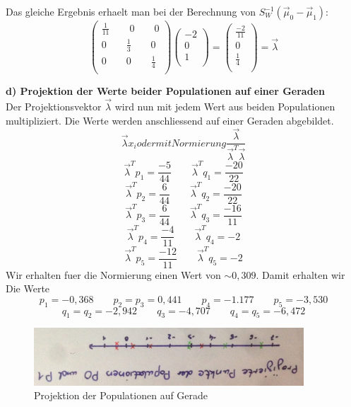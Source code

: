 \documentclass{article}
\begin{document}
Das gleiche Ergebnis erhaelt man bei der Berechnung von $S_W^{-1}(\vec{\mu}_0 - \vec{\mu}_1)$:
\[
\left(
\begin {array} {c}
\frac{1}{11} \qquad 0 \qquad 0  \\
0 \qquad \frac{1}{3} \qquad 0  \\
0 \qquad 0 \qquad \frac{1}{4}  \\
\end {array}
\right)
\left(
\begin {array} {c}
-2  \\
0  \\
1  \\
\end {array}
\right)
=
\left(
\begin {array} {c}
\frac{-2}{11}  \\
0  \\
\frac{1}{4}  \\
\end {array}
\right)
= \vec{\lambda}
\]

\textbf{d) Projektion der Werte beider Populationen auf einer Geraden} \\
Der Projektionsvektor $\vec{\lambda}$ wird nun mit jedem Wert aus beiden Populationen multipliziert.
Die Werte werden anschliessend auf einer Geraden abgebildet.
\[
\vec{\lambda} x_i oder mit Normierung \frac{\vec{\lambda}}{\vec{\lambda}^T\vec{\lambda}}
\]
\[
\vec{\lambda}^Tp_1 = \frac{-5}{44} \qquad \vec{\lambda}^Tq_1 = \frac{-20}{22}
\]
\[
\vec{\lambda}^Tp_2 = \frac{6}{44} \qquad \vec{\lambda}^Tq_2 = \frac{-20}{22}
\]
\[
\vec{\lambda}^Tp_3 = \frac{6}{44} \qquad \vec{\lambda}^Tq_3 = \frac{-16}{11}
\]
\[
\vec{\lambda}^Tp_4 = \frac{-4}{11} \qquad \vec{\lambda}^Tq_4 = -2
\]
\[
\vec{\lambda}^Tp_5 = \frac{-12}{11} \qquad \vec{\lambda}^Tq_5 = -2
\]
Wir erhalten fuer die Normierung einen Wert von $\sim 0,309$. Damit erhalten wir Die Werte
\[
p_1 = -0,368 \qquad p_2 = p_3 = 0,441 \qquad p_4 = -1.177 \qquad p_5 = -3,530
\]
\[
q_1 = q_2 = -2,942 \qquad q_3 = -4,707 \qquad q_4 = q_5 = -6,472
\]
\begin{figure}[htbp]
	\centering
	\includegraphics[width=0.9\textwidth]{Projektion.png}
	\caption{Projektion der Populationen auf Gerade}
\end{figure}
\end{document}
